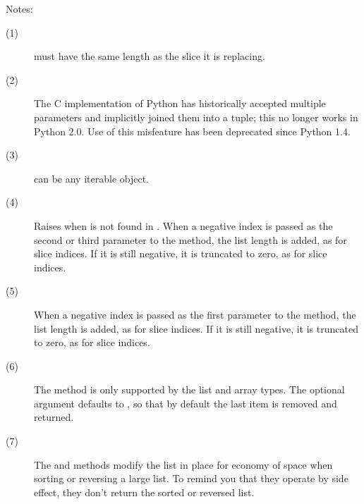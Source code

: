 \noindent
Notes:
\begin{description}
\item[(1)]  must have the same length as the slice it is 
  replacing.

\item[(2)] The C implementation of Python has historically accepted
  multiple parameters and implicitly joined them into a tuple; this
  no longer works in Python 2.0.  Use of this misfeature has been
  deprecated since Python 1.4.

\item[(3)]  can be any iterable object.

\item[(4)] Raises  when  is not found in
  . When a negative index is passed as the second or third parameter
  to the  method, the list length is added, as for slice
  indices.  If it is still negative, it is truncated to zero, as for
  slice indices.  

\item[(5)] When a negative index is passed as the first parameter to
  the  method, the list length is added, as for slice
  indices.  If it is still negative, it is truncated to zero, as for
  slice indices.  

\item[(6)] The  method is only supported by the list and
  array types.  The optional argument  defaults to ,
  so that by default the last item is removed and returned.

\item[(7)] The  and  methods modify the
  list in place for economy of space when sorting or reversing a large
  list.  To remind you that they operate by side effect, they don't return
  the sorted or reversed list.


\end{description}
